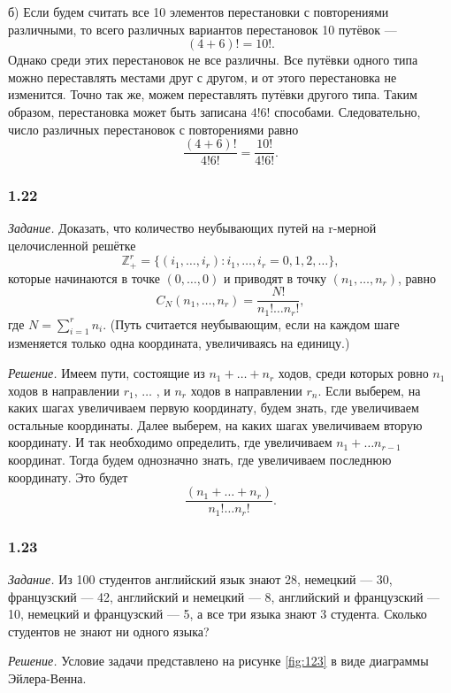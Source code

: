 \documentclass{book}
\begin{document}
б) Если будем считать все 10 элементов перестановки с повторениями различными, то всего различных вариантов перестановок 10 путёвок --- $$(4+6)!=10!.$$ Однако среди этих перестановок не все различны. Все путёвки одного типа можно переставлять местами друг с другом, и от этого перестановка не изменится. Точно так же, можем переставлять путёвки другого типа. Таким образом, перестановка может быть записана $4!6!$ способами. Следовательно, число различных перестановок с повторениями равно $$\frac{(4+6)!}{4!6!}=\frac{10!}{4!6!}.$$

\subsubsection*{1.22}

\textit{Задание.} Доказать, что количество неубывающих путей на r-мерной целочисленной решётке $$\mathbb{Z}_+^r=\{\left(i_1,  \dotsc , i_r\right): i_1,  \dotsc , i_r=0, 1, 2,  \dotsc \},$$ которые начинаются в точке $\left(0,  \dotsc , 0\right)$ и приводят в точку $\left(n_1,  \dotsc , n_r\right)$, равно $$C_N\left(n_1,  \dotsc , n_r\right)=\frac{N!}{n_1! \dotsc n_r!},$$ где $N=\sum\limits_{i=1}^rn_i$. (Путь считается неубывающим, если на каждом шаге изменяется только одна координата, увеличиваясь на единицу.)

\textit{Решение.} Имеем пути, состоящие из $n_1+ \dotsc +n_r$ ходов, среди которых ровно $n_1$ ходов в направлении $r_1$,  $\dotsc$ , и $n_r$ ходов в направлении $r_n$. Если выберем, на каких шагах увеличиваем первую координату, будем знать, где увеличиваем остальные координаты. Далее выберем, на каких шагах увеличиваем вторую координату. И так необходимо определить, где увеличиваем $n_1+ \dotsc n_{r-1}$ координат. Тогда будем однозначно знать, где увеличиваем последнюю координату. Это будет $$\frac{\left(n_1+ \dotsc +n_r\right)}{n_1! \dotsc n_r!}.$$

\subsubsection*{1.23}

\textit{Задание.} Из 100 студентов английский язык знают 28, немецкий --- 30, французский --- 42, английский и немецкий --- 8, английский и французский --- 10, немецкий и французский --- 5, а все три языка знают 3 студента. Сколько студентов не знают ни одного языка?

\textit{Решение.} Условие задачи представлено на рисунке \ref{fig:123} в виде диаграммы Эйлера-Венна. 
\end{document}
